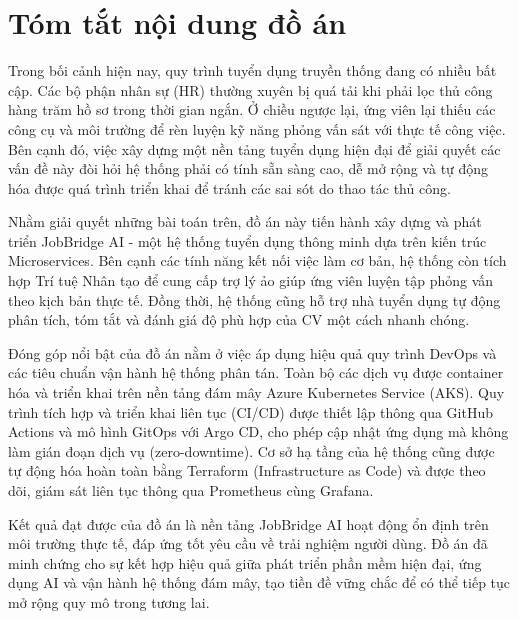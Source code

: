 \documentclass[../DoAn.tex]{subfiles}
\begin{document}
\chapter*{Tóm tắt nội dung đồ án}

Trong bối cảnh hiện nay, quy trình tuyển dụng truyền thống đang có nhiều bất cập. Các bộ phận nhân sự (HR) thường xuyên bị quá tải khi phải lọc thủ công hàng trăm hồ sơ trong thời gian ngắn. Ở chiều ngược lại, ứng viên lại thiếu các công cụ và môi trường để rèn luyện kỹ năng phỏng vấn sát với thực tế công việc. Bên cạnh đó, việc xây dựng một nền tảng tuyển dụng hiện đại để giải quyết các vấn đề này đòi hỏi hệ thống phải có tính sẵn sàng cao, dễ mở rộng và tự động hóa được quá trình triển khai để tránh các sai sót do thao tác thủ công.

Nhằm giải quyết những bài toán trên, đồ án này tiến hành xây dựng và phát triển JobBridge AI - một hệ thống tuyển dụng thông minh dựa trên kiến trúc Microservices. Bên cạnh các tính năng kết nối việc làm cơ bản, hệ thống còn tích hợp Trí tuệ Nhân tạo để cung cấp trợ lý ảo giúp ứng viên luyện tập phỏng vấn theo kịch bản thực tế. Đồng thời, hệ thống cũng hỗ trợ nhà tuyển dụng tự động phân tích, tóm tắt và đánh giá độ phù hợp của CV một cách nhanh chóng.

Đóng góp nổi bật của đồ án nằm ở việc áp dụng hiệu quả quy trình DevOps và các tiêu chuẩn vận hành hệ thống phân tán. Toàn bộ các dịch vụ được container hóa và triển khai trên nền tảng đám mây Azure Kubernetes Service (AKS). Quy trình tích hợp và triển khai liên tục (CI/CD) được thiết lập thông qua GitHub Actions và mô hình GitOps với Argo CD, cho phép cập nhật ứng dụng mà không làm gián đoạn dịch vụ (zero-downtime). Cơ sở hạ tầng của hệ thống cũng được tự động hóa hoàn toàn bằng Terraform (Infrastructure as Code) và được theo dõi, giám sát liên tục thông qua Prometheus cùng Grafana.

Kết quả đạt được của đồ án là nền tảng JobBridge AI hoạt động ổn định trên môi trường thực tế, đáp ứng tốt yêu cầu về trải nghiệm người dùng. Đồ án đã minh chứng cho sự kết hợp hiệu quả giữa phát triển phần mềm hiện đại, ứng dụng AI và vận hành hệ thống đám mây, tạo tiền đề vững chắc để có thể tiếp tục mở rộng quy mô trong tương lai.
\end{document}
